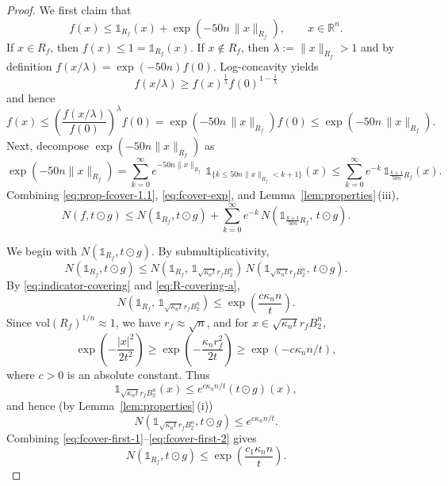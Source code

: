 \documentclass[11pt,leqno]{article}
\theoremstyle{definition}
\theoremstyle{remark}
\numberwithin{equation}{section}
\newcommand{\vol}{\mathrm{vol}}
\newcommand{\ls}{\leqslant}
\newcommand{\gr}{\geqslant}
\begin{document}
\begin{proof}
We first claim that
\begin{equation}\label{eq:prop-fcover-1.1}
f(x)\ls \mathds{1}_{R_f}(x)+\exp\!\left(-50n\,\|x\|_{R_f}\right),\qquad x\in\mathbb{R}^n.
\end{equation}
If $x\in R_f$, then $f(x)\ls 1=\mathds{1}_{R_f}(x)$. If $x\notin R_f$, then $\lambda:=\|x\|_{R_f}>1$ and by definition
$f(x/\lambda)=\exp(-50n)f(0)$. Log-concavity yields
$$f(x/\lambda)\gr f(x)^{\frac{1}{\lambda}}f(0)^{1-\frac{1}{\lambda}}$$
and hence
\begin{equation}\label{eq:no-need-1}f(x)\ls \left(\frac{f(x/\lambda)}{f(0)}\right)^{\lambda}f(0)=\exp\!\left(-50n\,\|x\|_{R_f}\right)f(0)
\ls \exp\!\left(-50n\,\|x\|_{R_f}\right).\end{equation}
Next, decompose $\exp(-50n\|x\|_{R_f})$ as
\begin{equation}\label{eq:fcover-exp}
\exp(-50n\|x\|_{R_f})=\sum_{k=0}^{\infty}e^{-50n\|x\|_{R_f}}
\,\mathds{1}_{\{k\ls 50n\|x\|_{R_f}<k+1\}}(x)
\ls \sum_{k=0}^{\infty}e^{-k}\,\mathds{1}_{\frac{k+1}{50n}R_f}(x).
\end{equation}
Combining \eqref{eq:prop-fcover-1.1}, \eqref{eq:fcover-exp}, and Lemma~\ref{lem:properties}\,(iii),
\begin{equation}\label{eq:fcover-sum}
N(f,t\odot g)\ls N(\mathds{1}_{R_f},t\odot g)+\sum_{k=0}^{\infty}e^{-k}\,
N(\mathds{1}_{\frac{k+1}{50n}R_f},\,t\odot g).
\end{equation}

We begin with $N(\mathds{1}_{R_f},t\odot g)$.
By submultiplicativity,
\begin{equation}\label{eq:fcover-first}
N(\mathds{1}_{R_f},t\odot g)\ls N(\mathds{1}_{R_f},\,\mathds{1}_{\sqrt{\kappa_nt}r_f B_2^n})
\,N(\mathds{1}_{\sqrt{\kappa_nt}r_f B_2^n},\,t\odot g).
\end{equation}
By \eqref{eq:indicator-covering} and \eqref{eq:R-covering-a},
\begin{equation}\label{eq:fcover-first-1}
N(\mathds{1}_{R_f},\,\mathds{1}_{\sqrt{\kappa_nt}r_f B_2^n})\ls \exp\!\left(\frac{c\kappa_n n}{t}\right).
\end{equation}
Since $\vol(R_f)^{1/n}\approx 1$, we have $r_f\approx\sqrt{n}$, and for $x\in \sqrt{\kappa_nt}r_f B_2^n$,
$$\exp\!\left(-\frac{|x|^2}{2t^2}\right)\gr\exp\left(-\frac{\kappa_nr_f^2}{2t}\right) 
\gr\exp(-c\kappa_nn/t),$$
where $c>0$ is an absolute constant. Thus
$$\mathds{1}_{\sqrt{\kappa_nt}r_f B_2^n}(x)\ls e^{c\kappa_nn/t}(t\odot g)(x),$$
and hence (by Lemma~\ref{lem:properties}\,(i))
\begin{equation}\label{eq:fcover-first-2}
N(\mathds{1}_{\sqrt{\kappa_nt}r_f B_2^n},t\odot g)\ls e^{c\kappa_nn/t}.
\end{equation}
Combining \eqref{eq:fcover-first-1}--\eqref{eq:fcover-first-2} gives
\begin{equation}\label{eq:fcover-first-final}
N(\mathds{1}_{R_f},t\odot g)\ls \exp\!\left(\frac{c_1\kappa_n n}{t}\right).
\end{equation}


\end{proof}
\end{document}
